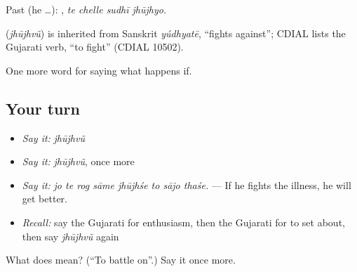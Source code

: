 Past (he …):    , \emph{te chelle sudhī jhūjhyo}.

\begin{cousinweb}
\textbf{} (\emph{jhūjhvũ}) is inherited from Sanskrit \emph{yúdhyatē}, \textquotedblleft{}fights against\textquotedblright{}; CDIAL lists the Gujarati verb, \textquotedblleft{}to fight\textquotedblright{} (CDIAL 10502).
\end{cousinweb}

\begin{grammarlens}[title={What you've built}]
One more word for saying what happens if.
\end{grammarlens}

\subsection*{Your turn}
\begin{itemize}
\raggedright
  \item \emph{Say it:} \emph{jhūjhvũ}
  \item \emph{Say it:} \emph{jhūjhvũ}, once more
  \item \emph{Say it:} \emph{jo te rog sāme jhūjhśe to sājo thaśe.} — If he fights the illness, he will get better.
  \item \emph{Recall:} say the Gujarati for enthusiasm, then the Gujarati for to set about, then say \emph{jhūjhvũ} again
\end{itemize}

\begin{tcolorbox}[breakable,colback=teal!4,colframe=teal!35!black,title={Before you move on}]
What does  mean? (\textquotedblleft{}To battle on\textquotedblright{}.) Say it once more.
\end{tcolorbox}

